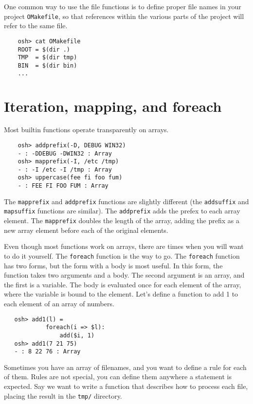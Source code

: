 One common way to use the file functions is to define proper file names in your project
\verb+OMakefile+, so that references within the various parts of the project will refer to the same
file.

\begin{verbatim}
    osh> cat OMakefile
    ROOT = $(dir .)
    TMP  = $(dir tmp)
    BIN  = $(dir bin)
    ...
\end{verbatim}

\section{Iteration, mapping, and foreach}

Most builtin functions operate transparently on arrays.

\begin{verbatim}
    osh> addprefix(-D, DEBUG WIN32)
    - : -DDEBUG -DWIN32 : Array
    osh> mapprefix(-I, /etc /tmp)
    - : -I /etc -I /tmp : Array
    osh> uppercase(fee fi foo fum)
    - : FEE FI FOO FUM : Array
\end{verbatim}

The \verb+mapprefix+ and \verb+addprefix+ functions are slightly different (the \verb+addsuffix+ and
\verb+mapsuffix+ functions are similar).  The \verb+addprefix+ adds the prefex to each array
element.  The \verb+mapprefix+ doubles the length of the array, adding the prefix as a new array
element before each of the original elements.

Even though most functions work on arrays, there are times when you will want to do it yourself.
The \verb+foreach+ function is the way to go.  The \verb+foreach+ function has two forms, but the
form with a body is most useful.  In this form, the function takes two arguments and a body.  The
second argument is an array, and the first is a variable.  The body is evaluated once for each
element of the array, where the variable is bound to the element.  Let's define a function to add 1
to each element of an array of numbers.

\begin{verbatim}
   osh> add1(l) =
            foreach(i => $l):
                add($i, 1)
   osh> add1(7 21 75)
   - : 8 22 76 : Array
\end{verbatim}

Sometimes you have an array of filenames, and you want to define a rule for each of them.  Rules are
not special, you can define them anywhere a statement is expected.  Say we want to write a function
that describes how to process each file, placing the result in the \verb+tmp/+ directory.

